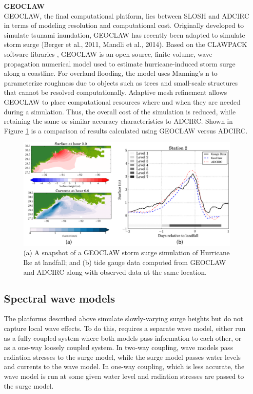 \noindent\textbf{GEOCLAW} \\GEOCLAW, the final computational platform, lies between SLOSH and ADCIRC in terms of modeling resolution and computational cost. Originally developed to simulate tsunami inundation, GEOCLAW has recently been adapted to simulate storm surge (Berger et al., 2011, Mandli et al., 2014). Based on the CLAWPACK software libraries \citep{leveque2002finite}, GEOCLAW is an open-source, finite-volume, wave-propagation numerical model used to estimate hurricane-induced storm surge along a coastline. For overland flooding, the model uses Manning's n to parameterize roughness due to objects such as trees and small-scale structures that cannot be resolved computationally. Adaptive mesh refinement allows GEOCLAW to place computational resources where and when they are needed during a simulation. Thus, the overall cost of the simulation is reduced, while retaining the same or similar accuracy characteristics to ADCIRC. Shown in Figure \ref{fig:GEOCLAW_ADCIRC_comparison} is a comparison of results calculated using GEOCLAW versus ADCIRC. 

\begin{figure}[htb]
    \centering
    \includegraphics[width=1.0\textwidth, angle = 0]{Figures/GEOCLAW_ADCIRC_comparison.png}
    \caption{(a) A snapshot of a GEOCLAW storm surge simulation of Hurricane Ike at landfall; and (b) tide gauge data computed from GEOCLAW and ADCIRC along with observed data at the same location. \citep{mandli2016clawpack}}
    \label{fig:GEOCLAW_ADCIRC_comparison}
\end{figure}

\subsection{Spectral wave models}

The platforms described above simulate slowly-varying surge heights but do not capture local wave effects. To do this, requires a separate wave model, either run as a fully-coupled system where both models pass information to each other, or as a one-way loosely coupled system. In two-way coupling, wave models pass radiation stresses to the surge model, while the surge model passes water levels and currents to the wave model. In one-way coupling, which is less accurate, the wave model is run at some given water level and radiation stresses are passed to the surge model.


